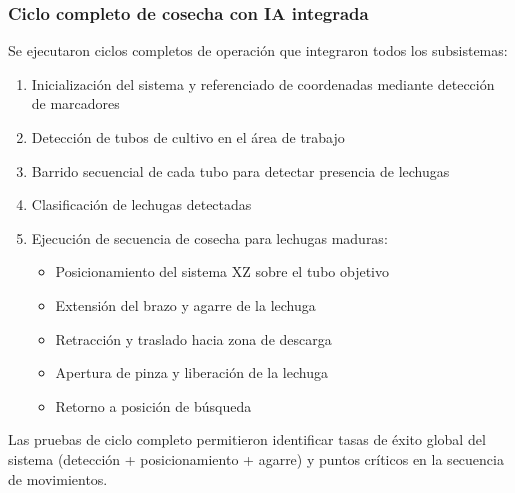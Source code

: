 \subsubsection{Ciclo completo de cosecha con IA integrada}

Se ejecutaron ciclos completos de operación que integraron todos los subsistemas:

\begin{enumerate}
    \item Inicialización del sistema y referenciado de coordenadas mediante detección de marcadores
    \item Detección de tubos de cultivo en el área de trabajo
    \item Barrido secuencial de cada tubo para detectar presencia de lechugas
    \item Clasificación de lechugas detectadas
    \item Ejecución de secuencia de cosecha para lechugas maduras:
    \begin{itemize}[label=$\bullet$]
        \item Posicionamiento del sistema XZ sobre el tubo objetivo
        \item Extensión del brazo y agarre de la lechuga
        \item Retracción y traslado hacia zona de descarga
        \item Apertura de pinza y liberación de la lechuga
        \item Retorno a posición de búsqueda
    \end{itemize}
\end{enumerate}

Las pruebas de ciclo completo permitieron identificar tasas de éxito global del sistema (detección + posicionamiento + agarre) y puntos críticos en la secuencia de movimientos. 
